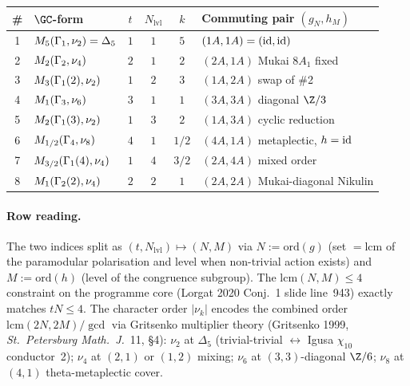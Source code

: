 \begin{center}
\small
\renewcommand{\arraystretch}{1.15}
\begin{tabular}{c|l|c|c|c|l}
\hline
\# & $\GC$-form & $t$ & $N_{\mathrm{lvl}}$ & $k$ & Commuting pair $(g_N, h_M)$ \\
\hline
1 & $M_{5}(\Gamma_1, \nu_{2}) = \Delta_5$    & $1$ & $1$ & $5$   & $(1A, 1A) = (\mathrm{id}, \mathrm{id})$ \\
2 & $M_{2}(\Gamma_2, \nu_{4})$               & $2$ & $1$ & $2$   & $(2A, 1A)$ Mukai $8A_1$ fixed \\
3 & $M_{3}(\Gamma_{1}(2), \nu_{2})$          & $1$ & $2$ & $3$   & $(1A, 2A)$ swap of \#2 \\
4 & $M_{1}(\Gamma_3, \nu_{6})$               & $3$ & $1$ & $1$   & $(3A, 3A)$ diagonal $\Z/3$ \\
5 & $M_{2}(\Gamma_{1}(3), \nu_{2})$          & $1$ & $3$ & $2$   & $(1A, 3A)$ cyclic reduction \\
6 & $M_{1/2}(\Gamma_4, \nu_{8})$             & $4$ & $1$ & $1/2$ & $(4A, 1A)$ metaplectic, $h=\mathrm{id}$ \\
7 & $M_{3/2}(\Gamma_{1}(4), \nu_{4})$        & $1$ & $4$ & $3/2$ & $(2A, 4A)$ mixed order \\
8 & $M_{1}(\Gamma_{2}(2), \nu_{4})$          & $2$ & $2$ & $1$   & $(2A, 2A)$ Mukai-diagonal Nikulin \\
\hline
\end{tabular}
\end{center}

\paragraph{Row reading.}\ClaimStatusTheorem{}
The two indices split as $(t, N_{\mathrm{lvl}}) \mapsto (N, M)$ via
$N := \mathrm{ord}(g)$ (set $=\mathrm{lcm}$ of the paramodular
polarisation and level when non-trivial action exists) and
$M := \mathrm{ord}(h)$ (level of the congruence subgroup).  The
$\mathrm{lcm}(N, M) \le 4$ constraint on the programme core
(Lorgat 2020 Conj.~1 slide line~943) exactly matches $tN \le 4$.
The character order $|\nu_k|$ encodes the combined order
$\mathrm{lcm}(2N, 2M) / \gcd$ via Gritsenko multiplier theory
(Gritsenko 1999, \emph{St.\ Petersburg Math.\ J.}~11, \S4):
$\nu_2$ at $\Delta_5$ (trivial-trivial $\leftrightarrow$ Igusa
$\chi_{10}$ conductor~2); $\nu_4$ at $(2,1)$ or $(1,2)$ mixing;
$\nu_6$ at $(3,3)$-diagonal $\Z/6$; $\nu_8$ at $(4,1)$
theta-metaplectic cover.

